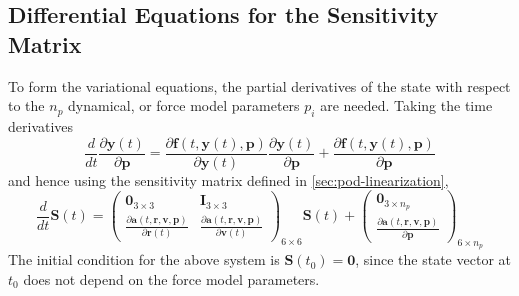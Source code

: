 \subsection{Differential Equations for the Sensitivity Matrix}\label{ssec:pod-sensitivity-ode}
To form the variational equations, the partial derivatives of the state with respect 
to the $n_p$ dynamical, or force model parameters $p_i$ are needed. Taking the 
time derivatives
\begin{equation}
    \frac{d}{dt}\frac{\partial \bm{y}(t)}{\partial \bm{p}} 
        = \frac{\partial \bm{f}(t,\bm{y}(t), \bm{p})}{\partial \bm{y}(t)} 
            \frac{\partial \bm{y}(t)}{\partial \bm{p}}
            + \frac{\partial \bm{f}(t,\bm{y}(t), \bm{p})}{\partial \bm{p}}
\end{equation}
and hence using the sensitivity matrix defined in \autoref{sec:pod-linearization},
\begin{equation}
    \frac{d}{dt}\bm{S}(t) = 
    \begin{pmatrix}
        \bm{0}_{3 \times 3} & \bm{I}_{3 \times 3} \\
        \frac{\partial \bm{a}(t,\bm{r}, \bm{v}, \bm{p})}{\partial \bm{r}(t)} &
        \frac{\partial \bm{a}(t,\bm{r}, \bm{v}, \bm{p})}{\partial \bm{v}(t)}
    \end{pmatrix}_{6 \times 6} \bm{S}(t)
    +
    \begin{pmatrix}
        \bm{0}_{3 \times n_p} \\
        \frac{\partial \bm{a}(t,\bm{r}, \bm{v}, \bm{p})}{\partial \bm{p}}
    \end{pmatrix}_{6 \times n_p}
\end{equation}
The initial condition for the above system is $\bm{S}(t_0) = \bm{0}$, since the 
state vector at $t_0$ does not depend on the force model parameters.

